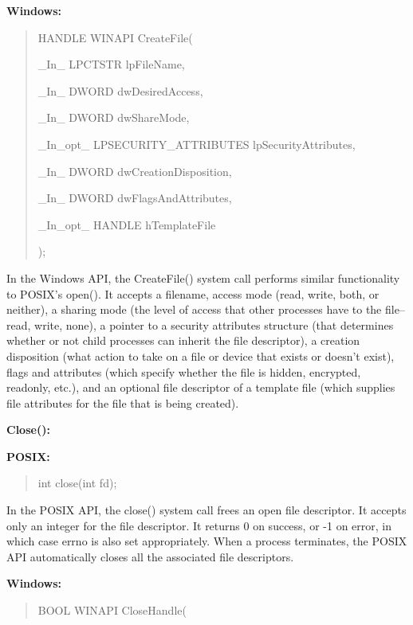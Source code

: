 \documentclass[letterpaper,10pt,titlepage]{article}
\newcommand{\tab}{\hspace*{2em}} %
\begin{document}
\begin{enumerate}
\textbf{Windows:}

\begin{quote}
HANDLE WINAPI CreateFile(

\tab\_In\_      LPCTSTR lpFileName,

\tab\_In\_      DWORD dwDesiredAccess,

\tab\_In\_      DWORD dwShareMode,

\tab\_In\_opt\_  LPSECURITY\_ATTRIBUTES lpSecurityAttributes,

\tab\_In\_      DWORD dwCreationDisposition,

\tab\_In\_      DWORD dwFlagsAndAttributes,

\tab\_In\_opt\_  HANDLE hTemplateFile

);
\end{quote}


\tab In the Windows API, the CreateFile() system call performs similar functionality to POSIX's open(). It accepts a filename, access mode (read, write, both, or neither), a sharing mode (the level of access that other processes have to the file--read, write, none), a pointer to a security attributes structure (that determines whether or not child processes can inherit the file descriptor), a creation disposition (what action to take on a file or device that exists or doesn't exist), flags and attributes (which specify whether the file is hidden, encrypted, readonly, etc.), and an optional file descriptor of a template file (which supplies file attributes for the file that is being created). \newline  


\textbf{Close():}

\textbf{POSIX:}

\begin{quote}
int close(int fd);
\end{quote}

\tab In the POSIX API, the close() system call frees an open file descriptor. It accepts only an integer for the file descriptor. It returns 0 on success, or -1 on error, in which case errno is also set appropriately. When a process terminates, the POSIX API automatically closes all the associated file descriptors.\newline

\textbf{Windows:} 

\begin{quote}
BOOL WINAPI CloseHandle(


\end{quote}
\end{enumerate}
\end{document}
